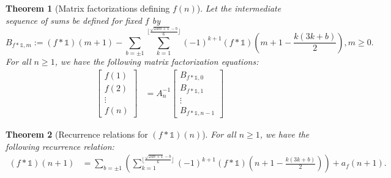 \documentclass[12pt,reqno,a4letter]{article}
\numberwithin{figure}{section}
\numberwithin{table}{section}
\numberwithin{equation}{section}
\theoremstyle{plain}
\newtheorem{theorem}{Theorem}
\numberwithin{theorem}{section}
\theoremstyle{definition}
\begin{document}
\begin{theorem}[Matrix factorizations defining $f(n)$] 
\label{prop_MatrixEquations_fi_eq_AinvBbm} 
Let the intermediate sequence of sums be defined for fixed $f$ by 
\[
B_{f \ast \mathds{1},m} :=  (f \ast \mathds{1})(m+1) - \sum_{b = \pm 1} \sum_{k=1}^{\lfloor \frac{\sqrt{24m+1}-b}{6} \rfloor} 
     (-1)^{k+1} (f \ast \mathds{1})\left(m+1-\frac{k(3k+b)}{2}\right), m \geq 0. 
\]
For all $n \geq 1$, we have the following matrix factorization equations: 
\begin{align} 
\label{eqn_fn_matrix_eqn}
\begin{bmatrix} f(1) \\ f(2) \\ \vdots \\ f(n) \end{bmatrix} & = 
     A_n^{-1} \begin{bmatrix} B_{f \ast \mathds{1}, 0} \\  B_{f \ast \mathds{1}, 1} \\ \vdots \\  B_{f \ast \mathds{1}, n-1} \end{bmatrix}
\end{align} 
\end{theorem} 

\begin{theorem}[Recurrence relations for $(f \ast \mathds{1})(n)$] 
\label{prop_bn_recs} 
For all $n \geq 1$, we have the following recurrence relation: 
\begin{align*} 
(f \ast \mathds{1})(n+1) & = \sum_{b = \pm 1} \left(\sum_{k=1}^{\lfloor \frac{\sqrt{24n+1}-b}{6} \rfloor} 
     (-1)^{k+1} (f \ast \mathds{1})\left(n+1-\frac{k(3k+b)}{2}\right)\right) + a_f(n+1). 
\end{align*} 
\end{theorem} 
\end{document}
